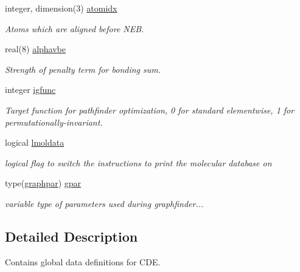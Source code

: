 \begin{DoxyCompactItemize}
\mbox{\label{namespaceglobaldata_ad7b7d7865f9c8b0bdd8aed48b8f8af63}} 
integer, dimension(3) \mbox{\hyperlink{namespaceglobaldata_ad7b7d7865f9c8b0bdd8aed48b8f8af63}{atomidx}}
\begin{DoxyCompactList}\small\item\em Atoms which are aligned before N\+EB. \end{DoxyCompactList}\item 
\mbox{\label{namespaceglobaldata_aed085331e87b1f1c8e30c0f4265e579f}} 
real(8) \mbox{\hyperlink{namespaceglobaldata_aed085331e87b1f1c8e30c0f4265e579f}{alphavbe}}
\begin{DoxyCompactList}\small\item\em Strength of penalty term for bonding sum. \end{DoxyCompactList}\item 
\mbox{\label{namespaceglobaldata_a42486a6d4c54fe6d1077e8b538329d9a}} 
integer \mbox{\hyperlink{namespaceglobaldata_a42486a6d4c54fe6d1077e8b538329d9a}{igfunc}}
\begin{DoxyCompactList}\small\item\em Target function for pathfinder optimization, 0 for standard elementwise, 1 for permutationally-\/invariant. \end{DoxyCompactList}\item 
logical \mbox{\hyperlink{namespaceglobaldata_a53b99c0c357633fec26adaf341b563d3}{lmoldata}}
\begin{DoxyCompactList}\small\item\em logical flag to switch the instructions to print the molecular database on \end{DoxyCompactList}\item 
\mbox{\label{namespaceglobaldata_a943effedf1da4756b6ba71d5f3d9035f}} 
type(\mbox{\hyperlink{structglobaldata_1_1graphpar}{graphpar}}) \mbox{\hyperlink{namespaceglobaldata_a943effedf1da4756b6ba71d5f3d9035f}{gpar}}
\begin{DoxyCompactList}\small\item\em variable type of parameters used during graphfinder... \end{DoxyCompactList}\end{DoxyCompactItemize}


\subsection{Detailed Description}
Contains global data definitions for C\+DE. 

